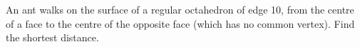 An ant walks on the surface of a regular octahedron of edge 10, from the centre of a face to the centre of the opposite face (which has no common vertex). Find the shortest distance.
